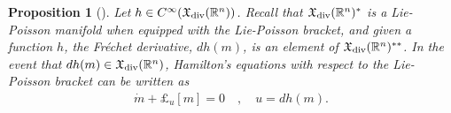 \documentclass[12pt]{amsart}
\newcommand{\R}{\ensuremath{\mathbb{R}}}
\newtheorem{prop}[thm]{Proposition}
\DeclareMathOperator{\SDiff}{SDiff}
\begin{document}
%  
  \begin{prop}[\cite{Arnold1966}] \label{prop:LPDiff}
  Let $h \in C^{\infty}( \mathfrak{X}_{\rm div}(\R^n) )$.
  Recall that $\mathfrak{X}_{\rm div}(\R^n)^*$ is a Lie-Poisson manifold when equipped with the Lie-Poisson bracket,
  and given a function $h$, the Fr\'echet derivative, $dh(m)$, is an element of $\mathfrak{X}_{\rm div}(\R^n)^{**}$.
  In the event that $dh(m) \in \mathfrak{X}_{\rm div}(\R^n)$,
  Hamilton's equations with respect to the Lie-Poisson
  bracket can be written as
  \begin{align}
    \dot{m} + \pounds_u [m] = 0 \quad , \quad u = dh(m) \label{eq:LP}.
  \end{align}
\end{prop}
\end{document}
